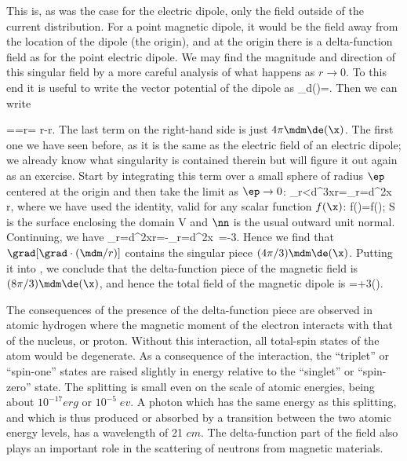{	This is, as was the case for the electric dipole, only
the field outside of the current distribution. For a point magnetic dipole,
it would be the field away from the location of the dipole (the origin),
and at the origin there is a delta-function field as for the point electric
dipole. We may find the magnitude and direction of this singular field by
a more careful analysis of what happens as $r\rightarrow0$. To this end it
is useful to write the vector potential of the dipole as
\beq
\A_d(\x)=\curl\lep\frac{\mdm}{|\x|}\rip.
\eeq
Then we can write

\beq
\Bx=\curl\Ax=\curl\leb\curl\lep\frac\mdm r\rip\rib=\grad\leb\div\lep\frac
\mdm r\rip\rib-\lap\lep\frac\mdm r\rip.
\eeq
The last term on the right-hand side is just $4\pi\mdm\de(\x)$. The first
one we have seen before, as it is the same as the electric field of an
electric dipole; we already know what singularity is contained therein but
will figure it out again as an exercise. Start by integrating this term
over a small sphere of radius $\ep$ centered at the origin and then take
the limit as $\ep\rightarrow0$:
\beq
\int_{r<\ep}d^3x\grad\leb\div\lep\frac\mdm r\rip\rib=\int_{r=\ep}d^2x
\nn\leb\div\lep\frac\mdm r\rip\rib,
\eeq
where we have used the identity, valid for any scalar function $f(\x)$:
\beq
\iniv\grad f(\x)=\inia\nn f(\x);
\eeq
S is the surface enclosing the domain V and $\nn$ is the usual outward unit
normal. Continuing, we have
\beq
\int_{r=\ep}d^2x\nn\leb\div\lep\frac\mdm r\rip\rib=-\int_{r=\ep}d^2x\,\rhh\lep
{}\rip=-\frac{4\pi}3\mdm.
\eeq
Hence we find that $\grad[\grad\cdot(\mdm/r)]$ contains the singular piece
$(4\pi/3)\mdm\de(\x)$. Putting it into , we conclude that the
delta-function piece of the magnetic field is $(8\pi/3)
\mdm\de(\x)$, and hence the total field of the magnetic dipole is
\beq
\Bx=+\frac{8\pi}3\mdm\de(\x).
\eeq

The consequences of the presence of the delta-function piece are observed
in atomic hydrogen where the magnetic moment of the electron interacts with
that of the nucleus, or proton. Without this interaction, all total-spin
states of the atom would be degenerate. As a consequence of the
interaction, the ``triplet'' or ``spin-one'' states are raised slightly in
energy relative to the ``singlet'' or ``spin-zero'' state. The splitting is
small even on the scale of atomic energies, being about $10^{-17} erg$ or
$10^{-5}\;ev$. A photon which has the same energy as this
splitting, and which is thus produced or absorbed by a transition between
the two atomic energy levels, has a wavelength of 21 $cm$. The delta-function
part of the field also plays an important role in the scattering of neutrons
from magnetic materials.

}
